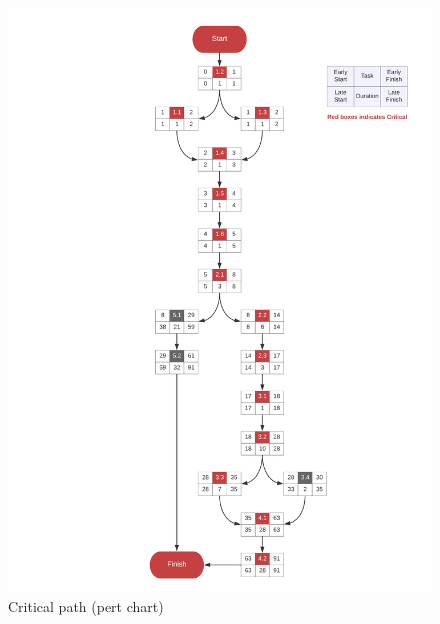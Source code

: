 \begin{figure}[H]
    \centerline{\includegraphics[width=170mm,scale=1]{figures/analysis_and_design/planning/Network diagram (PERT chart)- Cropped.png}}
    \caption{Critical path (pert chart)}
    \label{pertChart}
\end{figure}

